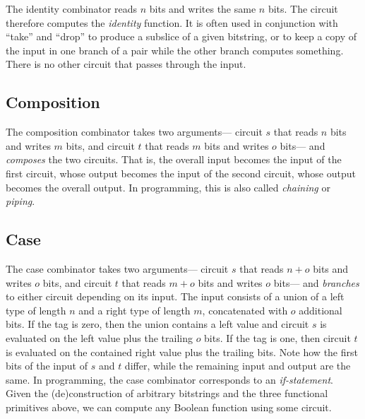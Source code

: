 
%
The identity combinator reads $n$ bits and writes the same $n$ bits.
The circuit therefore computes the \emph{identity} function.
%
It is often used in conjunction with \enquote{take} and \enquote{drop}
to produce a subslice of a given bitstring,
or to keep a copy of the input in one branch of a pair while the other branch computes something.
There is no other circuit that passes through the input.

\subsection{Composition}


%
The composition combinator takes two arguments---%
circuit $s$ that reads $n$ bits and writes $m$ bits,
and circuit $t$ that reads $m$ bits and writes $o$ bits---%
and \emph{composes} the two circuits.
That is,
the overall input becomes the input of the first circuit,
whose output becomes the input of the second circuit,
whose output becomes the overall output.
%
In programming, this is also called \emph{chaining} or \emph{piping}.

\subsection{Case}%
\label{ssec:case}


%
The case combinator takes two arguments---%
circuit $s$ that reads $n + o$ bits and writes $o$ bits,
and circuit $t$ that reads $m + o$ bits and writes $o$ bits---%
and \emph{branches} to either circuit depending on its input.
The input consists of a union of a left type of length $n$ and a right type of length $m$,
concatenated with $o$ additional bits.
If the tag is zero,
then the union contains a left value and circuit $s$ is evaluated on the left value plus the trailing $o$ bits.
If the tag is one,
then circuit $t$ is evaluated on the contained right value plus the trailing bits.
Note how the first bits of the input of $s$ and $t$ differ,
while the remaining input and output are the same.
%
In programming,
the case combinator corresponds to an \emph{if-statement}.
Given the (de)construction of arbitrary bitstrings and the three functional primitives above,
we can compute any Boolean function using some circuit.

%

